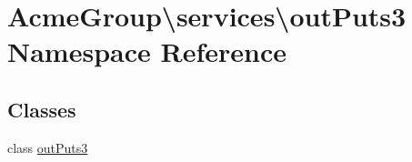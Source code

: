 \hypertarget{namespace_acme_group_1_1services_1_1out_puts3}{\section{Acme\+Group\textbackslash{}services\textbackslash{}out\+Puts3 Namespace Reference}
\label{namespace_acme_group_1_1services_1_1out_puts3}
}
\subsection*{Classes}
\begin{DoxyCompactItemize}
\item 
class \hyperlink{class_acme_group_1_1services_1_1out_puts3_1_1out_puts3}{out\+Puts3}
\end{DoxyCompactItemize}
